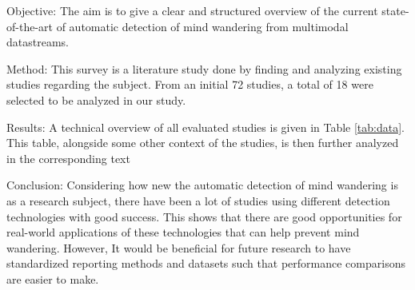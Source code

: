 Objective: The aim is to give a clear and structured overview of the current state-of-the-art of automatic detection of mind wandering from multimodal datastreams.

Method: This survey is a literature study done by finding and analyzing existing studies regarding the subject. From an initial 72 studies, a total of 18 were selected to be analyzed in our study.

Results: A technical overview of all evaluated studies is given in Table \ref{tab:data}. This table, alongside some other context of the studies, is then further analyzed in the corresponding text

Conclusion: Considering how new the automatic detection of mind wandering is as a research subject, there have been a lot of studies using different detection technologies with good success. This shows that there are good opportunities for real-world applications of these technologies that can help prevent mind wandering. However, It would be beneficial for future research to have standardized reporting methods and datasets such that performance comparisons are easier to make.